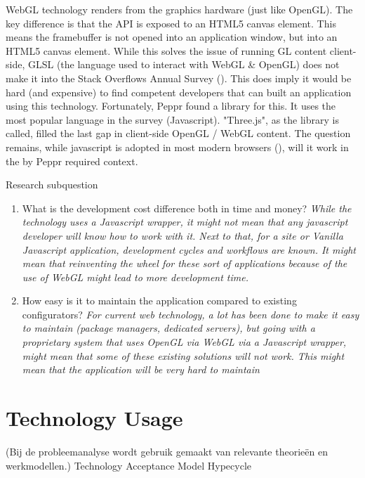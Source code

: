 \cite{webGL}

WebGL technology renders from the graphics hardware (just like OpenGL). The key difference is that the API is exposed to an HTML5 canvas element. This means the framebuffer is not opened into an application window, but into an HTML5 canvas element. While this solves the issue of running GL content client-side, GLSL (the language used to interact with WebGL \& OpenGL) does not make it into the Stack Overflows Annual Survey (\cite{stackoverflowDeveloperSurvey}). This does imply it would be hard (and expensive) to find competent developers that can built an application using this technology.
Fortunately, Peppr found a library for this. It uses the most popular language in the survey (Javascript). "Three.js", as the library is called, filled the last gap in client-side OpenGL / WebGL content. The question remains, while javascript is adopted in most modern browsers (\cite{javascriptSupport}), will it work in the by Peppr required context.

Research subquestion
\begin{enumerate}
	\item What is the development cost difference both in time and money? \textit{While the technology uses a Javascript wrapper, it might not mean that any javascript developer will know how to work with it. Next to that, for a site or Vanilla Javascript application, development cycles and workflows are known. It might mean that reinventing the wheel for these sort of applications because of the use of WebGL might lead to more development time.}
	\item How easy is it to maintain the application compared to existing configurators? \textit{For current web technology, a lot has been done to make it easy to maintain (package managers, dedicated servers), but going with a proprietary system that uses OpenGL via WebGL via a Javascript wrapper, might mean that some of these existing solutions will not work. This might mean that the application will be very hard to maintain}
\end{enumerate}
\section{Technology Usage}
(Bij de probleemanalyse wordt gebruik gemaakt van relevante theorieën en werkmodellen.)
Technology Acceptance Model
Hypecycle

